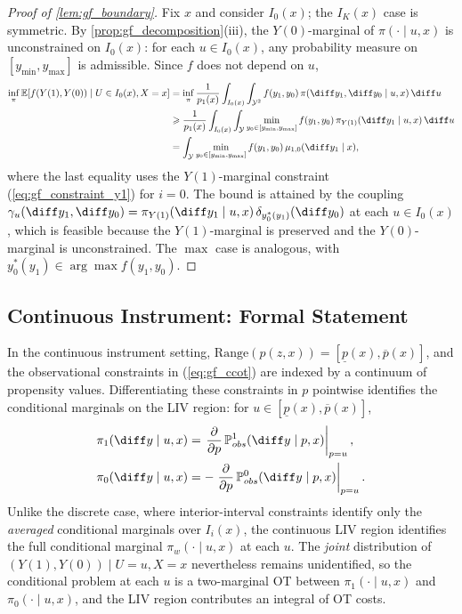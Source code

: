 \begin{proof}[Proof of \cref{lem:gf_boundary}]
    Fix $x$ and consider $I_0(x)$; the $I_K(x)$ case is symmetric. By \cref{prop:gf_decomposition}(iii), the $Y(0)$-marginal of $\pi(\cdot \mid u, x)$ is unconstrained on $I_0(x)$: for each $u \in I_0(x)$, any probability measure on $[y_{\min}, y_{\max}]$ is admissible. Since $f$ does not depend on $u$,
    \begin{align*}
        \inf_{\pi} \mathbb{E}[f(Y(1), Y(0)) \mid U \in I_0(x), X = x]
        &= \inf_{\pi} \frac{1}{p_1(x)} \int_{I_0(x)} \int_{\mathcal{Y}^2} f(y_1, y_0)\, \pi(\diff y_1, \diff y_0 \mid u, x)\, \diff u\\
        &\geqslant \frac{1}{p_1(x)} \int_{I_0(x)} \int_{\mathcal{Y}} \min_{y_0 \in [y_{\min}, y_{\max}]} f(y_1, y_0)\, \pi_{Y(1)}(\diff y_1 \mid u, x)\, \diff u\\
        &= \int_{\mathcal{Y}} \min_{y_0 \in [y_{\min}, y_{\max}]} f(y_1, y_0)\, \mu_{1,0}(\diff y_1 \mid x),
    \end{align*}
    where the last equality uses the $Y(1)$-marginal constraint (\ref{eq:gf_constraint_y1}) for $i = 0$. The bound is attained by the coupling $\gamma_u(\diff y_1, \diff y_0) = \pi_{Y(1)}(\diff y_1 \mid u, x)\, \delta_{y_0^*(y_1)}(\diff y_0)$ at each $u \in I_0(x)$, which is feasible because the $Y(1)$-marginal is preserved and the $Y(0)$-marginal is unconstrained. The $\max$ case is analogous, with $y_0^*(y_1) \in \arg\max f(y_1, y_0)$.
\end{proof}

\subsection{Continuous Instrument: Formal Statement}\label{subsec:proofs_gf_continuous}

In the continuous instrument setting, $\mathrm{Range}(p(z, x)) = [\underline{p}(x), \overline{p}(x)]$, and the observational constraints in (\ref{eq:gf_ccot}) are indexed by a continuum of propensity values. Differentiating these constraints in $p$ pointwise identifies the conditional marginals on the LIV region: for $u \in [\underline{p}(x), \overline{p}(x)]$,
\begin{equation}\label{eq:gf_liv_marginals}
    \begin{split}
        \pi_1(\diff y \mid u, x) &= \left.\frac{\partial}{\partial p}\, \mathbb{P}_{obs}^1(\diff y \mid p, x)\right|_{p = u}, \\
        \pi_0(\diff y \mid u, x) &= -\left.\frac{\partial}{\partial p}\, \mathbb{P}_{obs}^0(\diff y \mid p, x)\right|_{p = u}.
    \end{split}
\end{equation}
Unlike the discrete case, where interior-interval constraints identify only the \emph{averaged} conditional marginals over $I_i(x)$, the continuous LIV region identifies the full conditional marginal $\pi_w(\cdot \mid u, x)$ at each $u$. The \emph{joint} distribution of $(Y(1), Y(0)) \mid U = u, X = x$ nevertheless remains unidentified, so the conditional problem at each $u$ is a two-marginal OT between $\pi_1(\cdot \mid u, x)$ and $\pi_0(\cdot \mid u, x)$, and the LIV region contributes an integral of OT costs.

